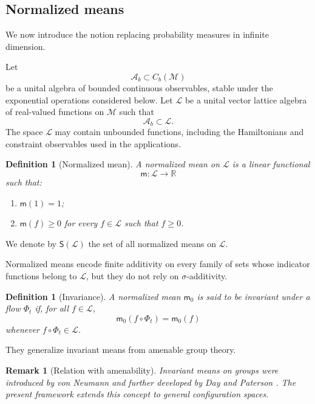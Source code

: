\documentclass[11pt,reqno]{amsart}
\newtheorem{Definition}[Theorem]{Definition}
\newtheorem{rem}[Theorem]{Remark}
\begin{document}
\subsection{Normalized means}

We now introduce the notion replacing probability measures in infinite
dimension.

Let
\[
\mathcal A_b\subset C_b(\mathcal M)
\]
be a unital algebra of bounded continuous observables, stable under the
exponential operations considered below. Let $\mathcal L$ be a unital
vector lattice algebra of real-valued functions on $\mathcal M$ such
that
\[
\mathcal A_b\subset\mathcal L.
\]
The space $\mathcal L$ may contain unbounded functions, including the
Hamiltonians and constraint observables used in the applications.

\begin{Definition}[Normalized mean]
\label{def:normalized-mean}
A \emph{normalized mean} on $\mathcal L$ is a linear functional
\[
\mathsf m\colon\mathcal L\longrightarrow\mathbb R
\]
such that:
\begin{enumerate}
\item[\textup{(i)}] $\mathsf m(1)=1$;
\item[\textup{(ii)}] $\mathsf m(f)\geq 0$ for every $f\in\mathcal L$
such that $f\geq 0$.
\end{enumerate}
\end{Definition}

We denote by $\mathsf S(\mathcal L)$ the set of all normalized means on
$\mathcal L$.

Normalized means encode finite additivity on every family of sets whose
indicator functions belong to $\mathcal L$, but they do not rely on
$\sigma$-additivity.

\begin{Definition}[Invariance]
A normalized mean $\mathsf m_0$ is said to be invariant under a flow
$\Phi_t$ if, for all $f\in\mathcal L$,
\[
\mathsf m_0(f\circ\Phi_t)=\mathsf m_0(f)
\]
whenever $f\circ\Phi_t\in\mathcal L$.
\end{Definition}

They generalize invariant means from amenable group theory.

\begin{rem}[Relation with amenability]
Invariant means on groups were introduced by von Neumann and further
developed by Day and Paterson
\cite{vonNeumann29,Day57,Paterson88}. The present framework extends this
concept to general configuration spaces.
\end{rem}
\end{document}
